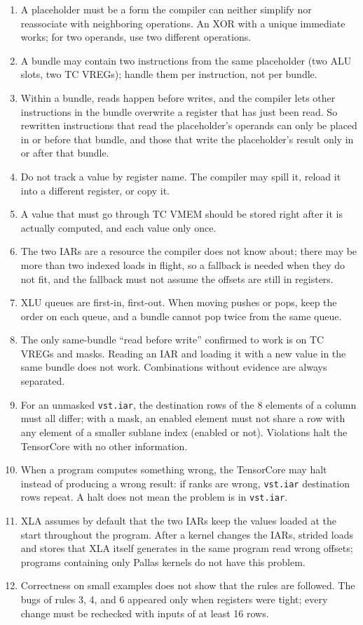 \documentclass[sigconf,nonacm,balance=false]{acmart}
\newcommand{\code}[1]{\texttt{#1}}
\begin{document}
\begin{enumerate}
\item A placeholder must be a form the compiler can neither simplify nor reassociate with neighboring operations. An XOR with a unique immediate works; for two operands, use two different operations.
\item A bundle may contain two instructions from the same placeholder (two ALU slots, two TC VREGs); handle them per instruction, not per bundle.
\item Within a bundle, reads happen before writes, and the compiler lets other instructions in the bundle overwrite a register that has just been read. So rewritten instructions that read the placeholder's operands can only be placed in or before that bundle, and those that write the placeholder's result only in or after that bundle.
\item Do not track a value by register name. The compiler may spill it, reload it into a different register, or copy it.
\item A value that must go through TC VMEM should be stored right after it is actually computed, and each value only once.
\item The two IARs are a resource the compiler does not know about; there may be more than two indexed loads in flight, so a fallback is needed when they do not fit, and the fallback must not assume the offsets are still in registers.
\item XLU queues are first-in, first-out. When moving pushes or pops, keep the order on each queue, and a bundle cannot pop twice from the same queue.
\item The only same-bundle ``read before write'' confirmed to work is on TC VREGs and masks. Reading an IAR and loading it with a new value in the same bundle does not work. Combinations without evidence are always separated.
\item For an unmasked \code{vst.\allowbreak{}iar}, the destination rows of the 8 elements of a column must all differ; with a mask, an enabled element must not share a row with any element of a smaller sublane index (enabled or not). Violations halt the TensorCore with no other information.
\item When a program computes something wrong, the TensorCore may halt instead of producing a wrong result: if ranks are wrong, \code{vst.\allowbreak{}iar} destination rows repeat. A halt does not mean the problem is in \code{vst.\allowbreak{}iar}.
\item XLA assumes by default that the two IARs keep the values loaded at the start throughout the program. After a kernel changes the IARs, strided loads and stores that XLA itself generates in the same program read wrong offsets; programs containing only Pallas kernels do not have this problem.
\item Correctness on small examples does not show that the rules are followed. The bugs of rules 3, 4, and 6 appeared only when registers were tight; every change must be rechecked with inputs of at least 16 rows.
\end{enumerate}
\end{document}
